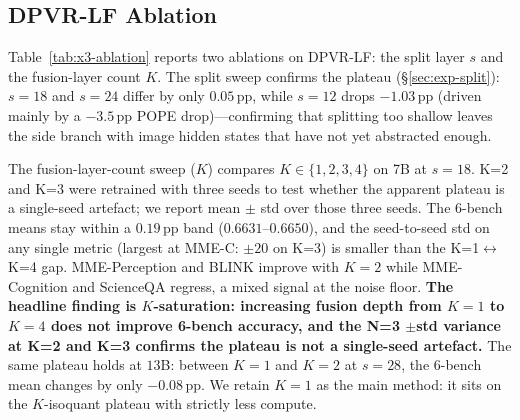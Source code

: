 \documentclass[a4paper,fleqn,review]{cas-sc}
\newcommand{\tbd}[0]{\textcolor{red}{[TBD]}}
\newcommand{\dpvrlf}{DPVR-LF}
\begin{document}
\subsection{\dpvrlf{} Ablation}\label{sec:exp-x3-ablation}

Table~\ref{tab:x3-ablation} reports two ablations on \dpvrlf{}: the
split layer $s$ and the fusion-layer count $K$. The split sweep
confirms the plateau (\S\ref{sec:exp-split}): $s = 18$ and $s = 24$
differ by only $0.05$\,pp, while $s = 12$ drops $-1.03$\,pp (driven
mainly by a $-3.5$\,pp POPE drop)---confirming that splitting too
shallow leaves the side branch with image hidden states that have
not yet abstracted enough.

The fusion-layer-count sweep ($K$) compares $K \in \{1, 2, 3, 4\}$
on 7B at $s = 18$. K=2 and K=3 were retrained with three seeds to
test whether the apparent plateau is a single-seed artefact; we
report mean $\pm$ std over those three seeds. The 6-bench means
stay within a $0.19$\,pp band ($0.6631$--$0.6650$), and the
seed-to-seed std on any single metric (largest at MME-C: $\pm 20$
on K=3) is smaller than the K=1$\leftrightarrow$K=4 gap. MME-Perception
and BLINK improve with $K = 2$ while MME-Cognition and ScienceQA
regress, a mixed signal at the noise floor. \textbf{The headline
finding is $K$-saturation: increasing fusion depth from $K = 1$ to
$K = 4$ does not improve 6-bench accuracy, and the N=3 $\pm$std
variance at K=2 and K=3 confirms the plateau is not a single-seed
artefact.} The same plateau holds at $13$B: between $K = 1$ and
$K = 2$ at $s = 28$, the 6-bench mean changes by only
$-0.08$\,pp. We retain $K = 1$ as the main method: it sits on the
$K$-isoquant plateau with strictly less compute.
\end{document}
